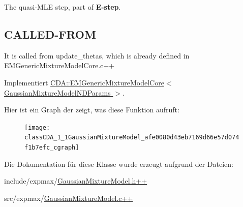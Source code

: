 The quasi-\/MLE step, part of {\bfseries E-\/step}. 

\hypertarget{classCDA_1_1GaussianMixtureModel_CALLED-FROM}{}\subsection{CALLED-\/FROM}\label{classCDA_1_1GaussianMixtureModel_CALLED-FROM}
It is called from update\_\-thetas, which is already defined in EMGenericMixtureModelCore.c++ 

Implementiert \hyperlink{classCDA_1_1EMGenericMixtureModelCore_aed2b50eb2bb8582204e186e3d5834c0a}{CDA::EMGenericMixtureModelCore$<$ GaussianMixtureModelNDParams $>$}.



Hier ist ein Graph der zeigt, was diese Funktion aufruft:\nopagebreak
\begin{figure}[H]
\begin{center}
\leavevmode
\texttt{[image: classCDA\_1\_1GaussianMixtureModel\_afe0080d43eb7169d66e57d074f1b7efc\_cgraph]}
\end{center}
\end{figure}




Die Dokumentation für diese Klasse wurde erzeugt aufgrund der Dateien:\begin{DoxyCompactItemize}
\item 
include/expmax/\hyperlink{GaussianMixtureModel_8h_09_09}{GaussianMixtureModel.h++}\item 
src/expmax/\hyperlink{GaussianMixtureModel_8c_09_09}{GaussianMixtureModel.c++}\end{DoxyCompactItemize}
